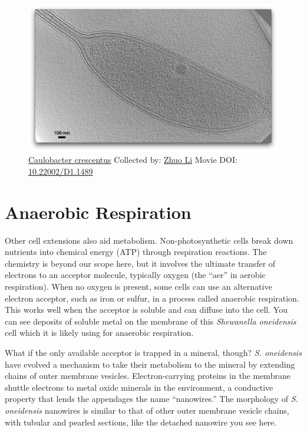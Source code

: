 \documentclass[]{tufte-book}
\begin{document}
\begin{figure}
\includegraphics{movie_stills/4_1} \caption[\protect\hyperlink{tree}{Caulobacter crescentus} Collected by:
\protect\hyperlink{zhuo_li}{Zhuo Li} Movie DOI:
\href{https://doi.org/10.22002/D1.1489}{10.22002/D1.1489}]{\protect\hyperlink{tree}{Caulobacter crescentus} Collected by:
\protect\hyperlink{zhuo_li}{Zhuo Li} Movie DOI:
\href{https://doi.org/10.22002/D1.1489}{10.22002/D1.1489}}\label{fig:4-1}
\end{figure}

\section{Anaerobic Respiration}\label{anaerobic-respiration}

Other cell extensions also aid metabolism. Non-photosynthetic cells
break down nutrients into chemical energy (ATP) through respiration
reactions. The chemistry is beyond our scope here, but it involves the
ultimate transfer of electrons to an acceptor molecule, typically oxygen
(the ``aer'' in aerobic respiration). When no oxygen is present, some
cells can use an alternative electron acceptor, such as iron or sulfur,
in a process called anaerobic respiration. This works well when the
acceptor is soluble and can diffuse into the cell. You can see deposits
of soluble metal on the membrane of this \emph{Shewanella oneidensis}
cell which it is likely using for anaerobic respiration.

What if the only available acceptor is trapped in a mineral, though?
\emph{S. oneidensis} have evolved a mechanism to take their metabolism
to the mineral by extending chains of outer membrane vesicles.
Electron-carrying proteins in the membrane shuttle electrons to metal
oxide minerals in the environment, a conductive property that lends the
appendages the name ``nanowires.'' The morphology of \emph{S.
oneidensis} nanowires is similar to that of other outer membrane vesicle
chains, with tubular and pearled sections, like the detached nanowire
you see here.
\end{document}
